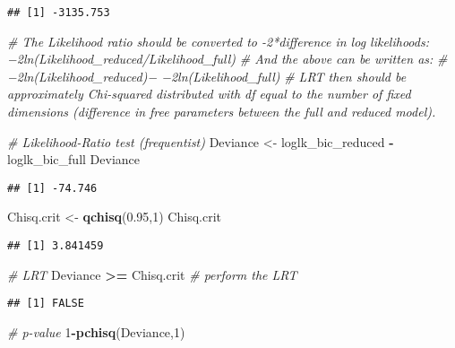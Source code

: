 \documentclass[]{article}
\newenvironment{Shaded}{\begin{snugshade}}{\end{snugshade}}
\newcommand{\CommentTok}[1]{\textcolor[rgb]{0.56,0.35,0.01}{\textit{#1}}}
\newcommand{\DecValTok}[1]{\textcolor[rgb]{0.00,0.00,0.81}{#1}}
\newcommand{\FloatTok}[1]{\textcolor[rgb]{0.00,0.00,0.81}{#1}}
\newcommand{\KeywordTok}[1]{\textcolor[rgb]{0.13,0.29,0.53}{\textbf{#1}}}
\newcommand{\NormalTok}[1]{#1}
\newcommand{\OperatorTok}[1]{\textcolor[rgb]{0.81,0.36,0.00}{\textbf{#1}}}
\newcommand{\StringTok}[1]{\textcolor[rgb]{0.31,0.60,0.02}{#1}}
\begin{document}
\begin{verbatim}
## [1] -3135.753
\end{verbatim}

\begin{Shaded}
\begin{Highlighting}[]
\CommentTok{# The Likelihood ratio should be converted to -2*difference in log likelihoods: −2ln(Likelihood_reduced/Likelihood_full)}
\CommentTok{# And the above can be written as:}
\CommentTok{# −2ln(Likelihood_reduced)− −2ln(Likelihood_full)}
\CommentTok{# LRT then should be approximately Chi-squared distributed with df equal to the number of fixed dimensions (difference in free parameters between the full and reduced model).}

\CommentTok{# Likelihood-Ratio test (frequentist)}
\NormalTok{Deviance <-}\StringTok{ }\NormalTok{loglk_bic_reduced }\OperatorTok{-}\StringTok{ }\NormalTok{loglk_bic_full }
\NormalTok{Deviance}
\end{Highlighting}
\end{Shaded}

\begin{verbatim}
## [1] -74.746
\end{verbatim}

\begin{Shaded}
\begin{Highlighting}[]
\NormalTok{Chisq.crit <-}\StringTok{ }\KeywordTok{qchisq}\NormalTok{(}\FloatTok{0.95}\NormalTok{,}\DecValTok{1}\NormalTok{)}
\NormalTok{Chisq.crit}
\end{Highlighting}
\end{Shaded}

\begin{verbatim}
## [1] 3.841459
\end{verbatim}

\begin{Shaded}
\begin{Highlighting}[]
\CommentTok{# LRT}
\NormalTok{Deviance }\OperatorTok{>=}\StringTok{ }\NormalTok{Chisq.crit   }\CommentTok{# perform the LRT}
\end{Highlighting}
\end{Shaded}

\begin{verbatim}
## [1] FALSE
\end{verbatim}

\begin{Shaded}
\begin{Highlighting}[]
\CommentTok{# p-value}
\DecValTok{1}\OperatorTok{-}\KeywordTok{pchisq}\NormalTok{(Deviance,}\DecValTok{1}\NormalTok{)}
\end{Highlighting}
\end{Shaded}
\end{document}

